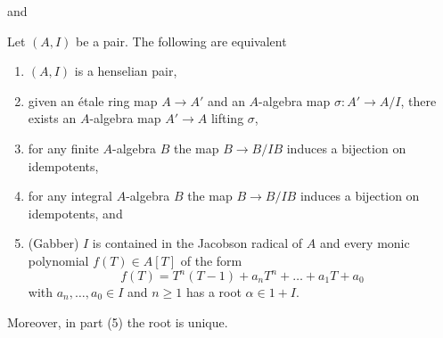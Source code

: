 \begin{lemma}
\label{lemma-characterize-henselian-pair}
\begin{reference}
\cite[Chapter XI]{Henselian} and \cite[Proposition 1]{Gabber-henselian}
\end{reference}
Let $(A, I)$ be a pair. The following are equivalent
\begin{enumerate}
\item $(A, I)$ is a henselian pair,
\item given an \'etale ring map $A \to A'$ and an $A$-algebra map
$\sigma : A' \to A/I$, there exists an $A$-algebra map $A' \to A$
lifting $\sigma$,
\item for any finite $A$-algebra $B$ the map $B \to B/IB$ induces
a bijection on idempotents,
\item for any integral $A$-algebra $B$ the map $B \to B/IB$ induces
a bijection on idempotents, and
\item (Gabber) $I$ is contained in the Jacobson radical of $A$ and
every monic polynomial $f(T) \in A[T]$ of the form
$$
f(T) = T^n(T - 1) + a_n T^n + \ldots + a_1 T + a_0
$$
with $a_n, \ldots, a_0 \in I$ and $n \ge 1$ has a root $\alpha \in 1 + I$.
\end{enumerate}
Moreover, in part (5) the root is unique.
\end{lemma}

